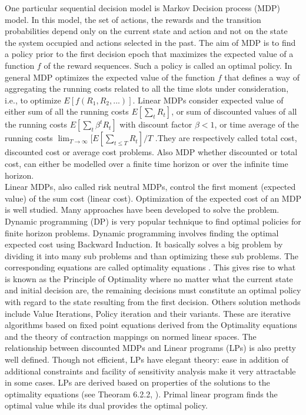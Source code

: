 \documentclass[11pt,a4paper,oneside]{report}
\begin{document}
\noindent One particular sequential decision model is Markov Decision process (MDP) model. In this model, the set of actions, the rewards and the transition probabilities depend only on the current state and action and not on the state the system occupied and actions selected in the past.  The aim of MDP is to find a policy prior to the first decision epoch that maximizes the expected value of a function $f$ of the reward sequences. Such a policy is called an optimal policy. In general MDP optimizes the expected value of the function $f$ that defines a way of aggregating the running costs related to all the time slots under consideration, i.e., to optimize $E[f(R_1,R_2,...)]$. Linear MDPs consider expected value of either sum of all the running costs $E[\sum_t{R_t} ]$, or sum of discounted values of all the running costs $E[\sum_t{\beta^t {R_t}} ]$ with discount factor $\beta<1$, or time average of the running costs $\lim_{T \to \infty}{[E[ \sum_{t\leq T}{R_t}]}{/T}$ .They are respectively called total cost, discounted cost or average cost problems. Also MDP whether discounted or total cost, can either be modelled over a finite time horizon or over the infinite time horizon. \\


\noindent Linear MDPs, also called risk neutral MDPs, control the first moment (expected value) of the sum cost (linear cost). Optimization of the expected cost of an MDP is well studied. Many approaches have been developed to solve the problem. Dynamic programming (DP) is very popular technique to find optimal policies for finite horizon problems. Dynamic programming involves finding the optimal expected cost using Backward Induction. It basically solves a big problem by dividing it into many sub problems and than optimizing these sub problems. The corresponding equations are called optimality equations \citep{puterman1990market}. This gives rise to what is known as the Principle of Optimality where no matter what the current state and initial decision are, the remaining decisions must constitute an optimal policy with regard to the state resulting from the first decision. Others solution methods include Value Iterations, Policy iteration and their variants. These are iterative algorithms based on fixed point equations derived from the Optimality equations and the theory of contraction mappings on normed linear spaces. The relationship between discounted MDPs and Linear programs (LPs) is also pretty well defined. Though not efficient, LPs have elegant theory: ease in addition of additional constraints and facility of sensitivity analysis make it very attractable in some cases. LPs are derived based on properties of the solutions to the optimality equations (see Theoram 6.2.2, \cite{puterman1990market}). Primal linear program finds the optimal value while its dual provides the optimal policy.\\
\end{document}
